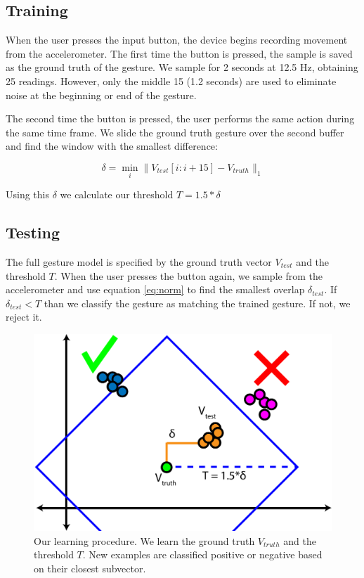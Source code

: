 \documentclass[12pt]{article}
\begin{document}
\subsection{Training}
When the user presses the input button, the device begins recording movement from the accelerometer. The first time the button is pressed, the sample is saved as the ground truth of the gesture. We sample for 2 seconds at 12.5 Hz, obtaining 25 readings. However, only the middle 15 (1.2 seconds) are used to eliminate noise at the beginning or end of the gesture.

The second time the button is pressed, the user performs the same action during the same time frame. We slide the ground truth gesture over the second buffer and find the window with the smallest difference:

\begin{equation}
\label{eq:norm}
\delta = \min_i \|V_{test}[i:i+15] - V_{truth} \|_1
\end{equation}

Using this $\delta$ we calculate our threshold $T = 1.5*\delta$

\subsection{Testing}
The full gesture model is specified by the ground truth vector $V_{test}$ and the threshold $T$. When the user presses the button again, we sample from the accelerometer and use equation \ref{eq:norm} to find the smallest overlap $\delta_{test}$. If $\delta_{test} < T$ than we classify the gesture as matching the trained gesture. If not, we reject it.

\begin{figure}[h]
\begin{center}
\includegraphics[width=.7\linewidth]{graph}
\end{center}
\caption{Our learning procedure. We learn the ground truth $V_{truth}$ and the threshold $T$. New examples are classified positive or negative based on their closest subvector.}
\label{graph}
\end{figure}
\end{document}
